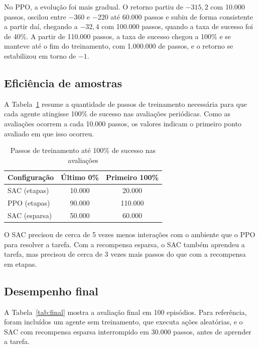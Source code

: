 \documentclass[conference]{IEEEtran}
\begin{document}
No PPO, a evolução foi mais gradual. O retorno partiu de $-315{,}2$ com 10.000 passos, oscilou entre $-360$ e $-220$ até 60.000 passos e subiu de forma consistente a partir daí, chegando a $-32{,}4$ com 100.000 passos, quando a taxa de sucesso foi de 40\%. A partir de 110.000 passos, a taxa de sucesso chegou a 100\% e se manteve até o fim do treinamento, com 1.000.000 de passos, e o retorno se estabilizou em torno de $-1$.

\subsection{Eficiência de amostras}

A Tabela~\ref{tab:eficiencia} resume a quantidade de passos de treinamento necessária para que cada agente atingisse 100\% de sucesso nas avaliações periódicas. Como as avaliações ocorrem a cada 10.000 passos, os valores indicam o primeiro ponto avaliado em que isso ocorreu.

\begin{table}[htb]
    \centering
    \caption{Passos de treinamento até 100\% de sucesso nas avaliações}
    \label{tab:eficiencia}
    \begin{tabular}{lcc}
        \hline
        Configuração & Último 0\% & Primeiro 100\% \\
        \hline
        SAC (etapas)   & 10.000 & 20.000 \\
        PPO (etapas)   & 90.000 & 110.000 \\
        SAC (esparsa)  & 50.000 & 60.000 \\
        \hline
    \end{tabular}
\end{table}

O SAC precisou de cerca de 5 vezes menos interações com o ambiente que o PPO para resolver a tarefa. Com a recompensa esparsa, o SAC também aprendeu a tarefa, mas precisou de cerca de 3 vezes mais passos do que com a recompensa em etapas.

\subsection{Desempenho final}

A Tabela~\ref{tab:final} mostra a avaliação final em 100 episódios. Para referência, foram incluídos um agente sem treinamento, que executa ações aleatórias, e o SAC com recompensa esparsa interrompido em 30.000 passos, antes de aprender a tarefa.
\end{document}
